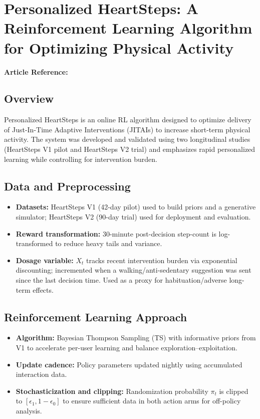 \section{Personalized HeartSteps: A Reinforcement Learning Algorithm for Optimizing Physical Activity}
\textbf{Article Reference:} \cite{liaoPersonalizedHeartStepsReinforcement2020}
\subsection*{Overview}
Personalized HeartSteps is an online RL algorithm designed to optimize delivery of Just-In-Time Adaptive Interventions (JITAIs) to increase short-term physical activity. The system was developed and validated using two longitudinal studies (HeartSteps V1 pilot and HeartSteps V2 trial) and emphasizes rapid personalized learning while controlling for intervention burden.

\subsection*{Data and Preprocessing}
\begin{itemize}
    \item \textbf{Datasets:} HeartSteps V1 (42-day pilot) used to build priors and a generative simulator; HeartSteps V2 (90-day trial) used for deployment and evaluation.
    \item \textbf{Reward transformation:} 30-minute post-decision step-count is log-transformed to reduce heavy tails and variance.
    \item \textbf{Dosage variable:} $X_t$ tracks recent intervention burden via exponential discounting; incremented when a walking/anti-sedentary suggestion was sent since the last decision time. Used as a proxy for habituation/adverse long-term effects.
\end{itemize}

\subsection*{Reinforcement Learning Approach}
\begin{itemize}
    \item \textbf{Algorithm:} Bayesian Thompson Sampling (TS) with informative priors from V1 to accelerate per-user learning and balance exploration–exploitation.
    \item \textbf{Update cadence:} Policy parameters updated nightly using accumulated interaction data.
    \item \textbf{Stochasticization and clipping:} Randomization probability $\pi_t$ is clipped to $[\epsilon_1,1-\epsilon_0]$ to ensure sufficient data in both action arms for off-policy analysis.
\end{itemize}

